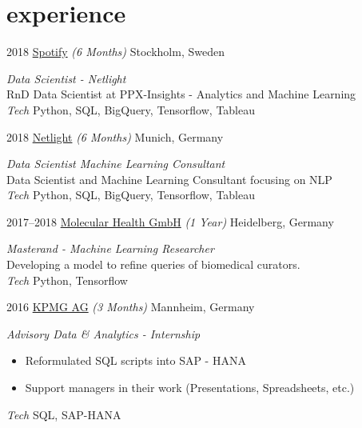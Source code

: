 \documentclass[hidelinks]{cv-style}          %
\begin{document}
\newpage
\vspace{20cm}

\section{experience}


\begin{entrylist}

\entry
{2018}
{\href{https://www.spotify.com/}{Spotify}  {\normalfont \emph{(6 Months)}}}
{Stockholm, Sweden}
{\emph{Data Scientist - Netlight} \\
RnD Data Scientist at PPX-Insights - Analytics and Machine Learning\\
\emph{Tech} Python, SQL, BigQuery, Tensorflow, Tableau

}

\entry
{2018}
{\href{https://www.netlight.com/}{Netlight}  {\normalfont \emph{(6 Months)}}}
{Munich, Germany}
{\emph{Data Scientist  Machine Learning Consultant} \\
Data Scientist and Machine Learning Consultant focusing on NLP\\
\emph{Tech} Python, SQL, BigQuery, Tensorflow, Tableau

}


\entry
{2017--2018}
{\href{http://www.molecularhealth.com/}{Molecular Health GmbH}  {\normalfont \emph{(1 Year)}}}
{Heidelberg, Germany}
{\emph{Masterand - Machine Learning Researcher} \\
Developing a model to refine queries of biomedical curators. \\
\emph{Tech} Python, Tensorflow

}





\entry
{2016}
{\href{https://home.kpmg.com/de/de/home/ueber-kpmg/offices/mannheim-1.html}{KPMG AG} {\normalfont \emph{(3 Months)}}}
{Mannheim, Germany}
{\emph{Advisory Data \& Analytics - Internship} 
\begin{itemize}
\item Reformulated SQL scripts into SAP - HANA
\item Support managers in their work (Presentations, Spreadsheets, etc.)
\end{itemize}
\emph{Tech} SQL, SAP-HANA

}
\end{entrylist}
\end{document}

